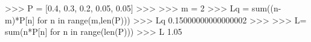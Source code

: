 
>>> P = [0.4, 0.3, 0.2, 0.05, 0.05]
>>>
>>> m = 2
>>> Lq = sum((n-m)*P[n] for n in range(m,len(P)))
>>> Lq
0.15000000000000002
>>>
>>> L= sum(n*P[n] for n in range(len(P)))
>>> L
1.05

